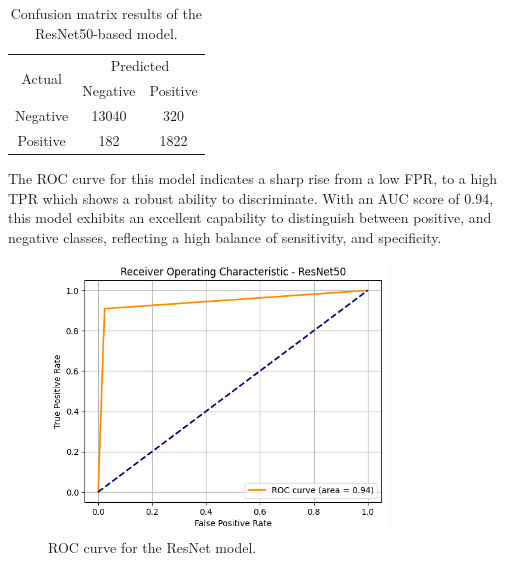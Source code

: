 \documentclass[../main]{subfiles}
\begin{document}
\begin{table}[h!]
    \centering
    \begin{tabular}{|c|c|c|}
        \hline
        \multirow{2}{*}{Actual} & \multicolumn{2}{c|}{Predicted} \\ \cline{2-3}
                                & Negative         & Positive         \\ \hline
        Negative                & 13040            & 320              \\ \hline
        Positive                & 182              & 1822              \\ \hline
    \end{tabular}
    \caption{Confusion matrix results of the ResNet50-based model.}
    \label{tab:confusion-matrix-resnet}
\end{table}

\noindent The ROC curve for this model indicates a sharp rise from a low FPR, to a high TPR which shows a robust ability to discriminate. With an AUC score of 0.94, this model exhibits an excellent capability to distinguish between positive, and negative classes, reflecting a high balance of sensitivity, and specificity.

\begin{figure}[h!]
	\centering
	\includegraphics[width=0.8\textwidth]{assets/roc_resnet.png}
	\caption{ROC curve for the ResNet model.}
    \label{fig:roc-resnet}
\end{figure}

\clearpage
\end{document}
